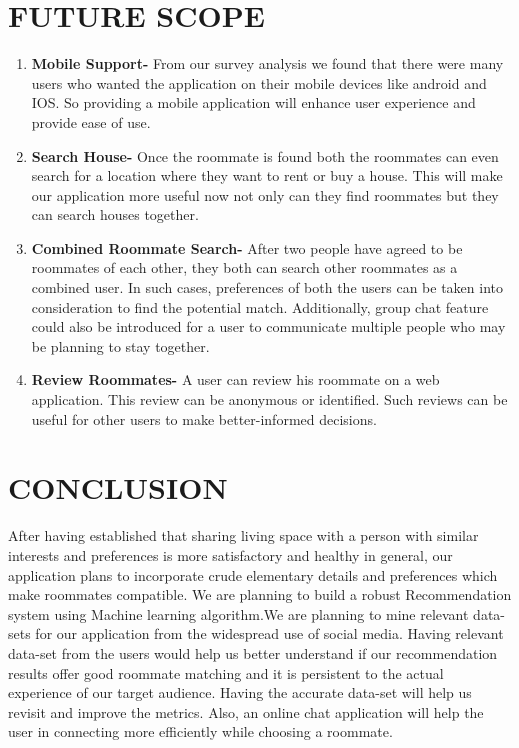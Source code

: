 \documentclass{sig-alternate-05-2015}
\begin{document}
\section{FUTURE SCOPE}

\begin{enumerate}
\item \textbf{Mobile Support-} From our survey analysis we found that there were many users who wanted the application on their mobile devices like android and IOS. So providing a mobile application will enhance user experience and provide ease of use. \\

\item \textbf{Search House-} Once the roommate is found both the roommates can even search for a location where they want to rent or buy a house. This will make our application more useful now not only can they find roommates but they can search houses together.\\

\item \textbf{Combined Roommate Search-} After two people have agreed to be roommates of each other, they both can search other roommates as a combined user. In such cases, preferences of both the users can be taken into consideration to find the potential match. Additionally, group chat feature could also be introduced for a user to communicate multiple people who may be planning to stay together.\\

\item \textbf{Review Roommates-} A user can review his roommate on a web application. This review can be anonymous or identified. Such reviews can be useful for other users to make better-informed decisions.\\
\end{enumerate}

\section{CONCLUSION}
After having established that sharing living space with a person with similar interests and preferences is more satisfactory and healthy in general, our application plans to incorporate crude elementary details and preferences which make roommates compatible. We are planning to build a robust Recommendation system using Machine learning algorithm.We are planning to mine relevant data-sets for our application from the widespread use of social media. Having relevant data-set from the users would help us better understand if our recommendation results offer good roommate matching and it is persistent to the actual experience of our target audience. Having the accurate data-set will help us revisit and improve the metrics. Also, an online chat application will help the user in connecting more efficiently while choosing a roommate.\\
\end{document}
